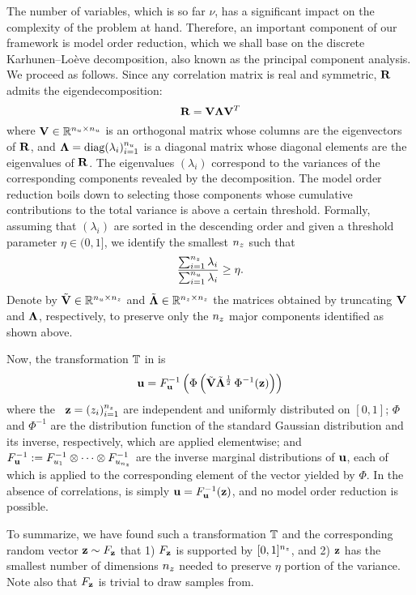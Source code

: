 The number of variables, which is so far $\nu$, has a significant impact on the
complexity of the problem at hand. Therefore, an important component of our
framework is model order reduction, which we shall base on the discrete
Karhunen--Lo\`{e}ve decomposition, also known as the principal component
analysis. We proceed as follows. Since any correlation matrix is real and
symmetric, $\mathbf{R}$ admits the eigendecomposition:
\[
  \mathbf{R} = \mathbf{V} \mathbf{\Lambda} \mathbf{V}^T
\]
where $\mathbf{V} \in \mathbb{R}^{{n_u} \times {n_u}}$ is an orthogonal matrix whose columns
are the eigenvectors of $\mathbf{R}$, and $\mathbf{\Lambda} = \text{diag}(\lambda_i)_{i =
1}^{n_u}$ is a diagonal matrix whose diagonal elements are the eigenvalues of
$\mathbf{R}$. The eigenvalues $(\lambda_i)$ correspond to the variances of the
corresponding components revealed by the decomposition. The model order
reduction boils down to selecting those components whose cumulative
contributions to the total variance is above a certain threshold. Formally,
assuming that $(\lambda_i)$ are sorted in the descending order and given a
threshold parameter $\eta \in (0, 1]$, we identify the smallest ${n_z}$ such that
\[
  \frac{\sum_{i = 1}^{n_z} \lambda_i}{\sum_{i = 1}^{n_u} \lambda_i} \geq \eta.
\]
Denote by $\tilde{\mathbf{V}} \in \mathbb{R}^{{n_u} \times {n_z}}$ and $\tilde{\mathbf{\Lambda}}
\in\mathbb{R}^{{n_z} \times {n_z}}$ the matrices obtained by truncating $\mathbf{V}$ and
$\mathbf{\Lambda}$, respectively, to preserve only the ${n_z}$ major components
identified as shown above.

Now, the transformation $\mathbb{T}$ in  is
\begin{equation} \elab{transformation}
  \vu = \distribution_\vu^{-1} \left( \Phi\left( \tilde{\m{V}} \tilde{\m{\Lambda}}^\frac{1}{2} \, \Phi^{-1}(\vz) \right) \right)
\end{equation}
where the \rvs\ $\mathbf{z} = (z_i)_{i = 1}^{n_z}$ are independent and uniformly
distributed on $[0, 1]$; $\Phi$ and $\Phi^{-1}$ are the distribution function of
the standard Gaussian distribution and its inverse, respectively, which are
applied elementwise; and $F_{\mathbf{u}}^{-1} := F_{u_1}^{-1}
\otimes \cdots \otimes F_{u_{n_z}}^{-1}$ are the inverse marginal
distributions of $\mathbf{u}$, each of which is applied to the corresponding element of
the vector yielded by $\Phi$. In the absence of correlations,
 is simply $\mathbf{u} = F_{\mathbf{u}}^{-1}(\mathbf{z})$, and no
model order reduction is possible.

To summarize, we have found such a transformation $\mathbb{T}$ and the
corresponding random vector $\mathbf{z} \sim F_{\mathbf{z}}$ that 1)
$F_{\mathbf{z}}$ is supported by $[0, 1]^{n_z}$, and 2) $\mathbf{z}$ has the smallest
number of dimensions ${n_z}$ needed to preserve $\eta$ portion of the variance.
Note also that $F_{\mathbf{z}}$ is trivial to draw samples from.
